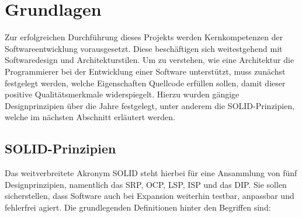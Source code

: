 

\chapter{Grundlagen}

Zur erfolgreichen Durchführung dieses Projekts werden Kernkompetenzen der Softwareentwicklung vorausgesetzt. Diese beschäftigen sich weitestgehend mit Softwaredesign und Architekturstilen. Um zu verstehen, wie eine Architektur die Programmierer bei der Entwicklung einer Software unterstützt, muss zunächst festgelegt werden, welche Eigenschaften Quellcode erfüllen sollen, damit dieser positive Qualitätsmerkmale widerspiegelt. Hierzu wurden gängige Designprinzipien über die Jahre festgelegt, unter anderem die SOLID-Prinzipien, welche im nächsten Abschnitt erläutert werden. %

\section{SOLID-Prinzipien}

Das weitverbreitete Akronym SOLID steht hierbei für eine Ansammlung von fünf Designprinzipien, namentlich das \acrfull{SRP}, \acrfull{OCP}, \acrfull{LSP}, \acrfull{ISP} und das \acrfull{DIP}. Sie sollen sicherstellen, dass Software auch bei Expansion weiterhin testbar, anpassbar und fehlerfrei agiert. Die grundlegenden Definitionen hinter den Begriffen sind:

